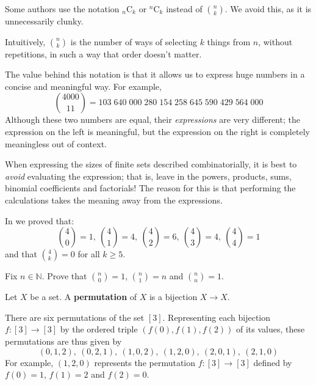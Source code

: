 Some authors use the notation ${}_n\mathrm{C}_k$ or ${}^n\mathrm{C}_k$ instead of $\binom{n}{k}$. We avoid this, as it is unnecessarily clunky.

Intuitively, $\binom{n}{k}$ is the number of ways of selecting $k$ things from $n$, without repetitions, in such a way that order doesn't matter.

The value behind this notation is that it allows us to express huge numbers in a concise and meaningful way. For example,
\[ \binom{4000}{11} = 103\;640\;000\;280\;154\;258\;645\;590\;429\;564\;000 \]
Although these two numbers are equal, their \textit{expressions} are very different; the expression on the left is meaningful, but the expression on the right is completely meaningless out of context.

\begin{writingtip}
When expressing the sizes of finite sets described combinatorially, it is best to \textit{avoid} evaluating the expression; that is, leave in the powers, products, sums, binomial coefficients and factorials! The reason for this is that performing the calculations takes the meaning away from the expressions.
\end{writingtip}

\begin{example} \label{exBinomCalc4}
In  we proved that:
\[ \binom{4}{0} = 1,\ \binom{4}{1} = 4,\ \binom{4}{2} = 6,\ \binom{4}{3} = 4,\ \binom{4}{4} = 1 \]
and that $\binom{4}{k} = 0$ for all $k \ge 5$.
\end{example}

\begin{exercise}
Fix $n \in \mathbb{N}$. Prove that $\binom{n}{0} = 1$, $\binom{n}{1} = n$ and $\binom{n}{n} = 1$.
\end{exercise}

\begin{definition}
\label{defPermutationPreliminary}
Let $X$ be a set. A \textbf{permutation} of $X$ is a bijection $X \to X$.
\end{definition}

\begin{example}
\label{exPermutationsOfBracket3}
There are six permutations of the set $[3]$. Representing each bijection $f : [3] \to [3]$ by the ordered triple $(f(0),f(1),f(2))$ of its values, these permutations are thus given by
\[ (0,1,2),\ (0,2,1),\ (1,0,2),\ (1,2,0),\ (2,0,1),\ (2,1,0) \]
For example, $(1,2,0)$ represents the permutation $f : [3] \to [3]$ defined by $f(0)=1$, $f(1)=2$ and $f(2)=0$.
\end{example}

